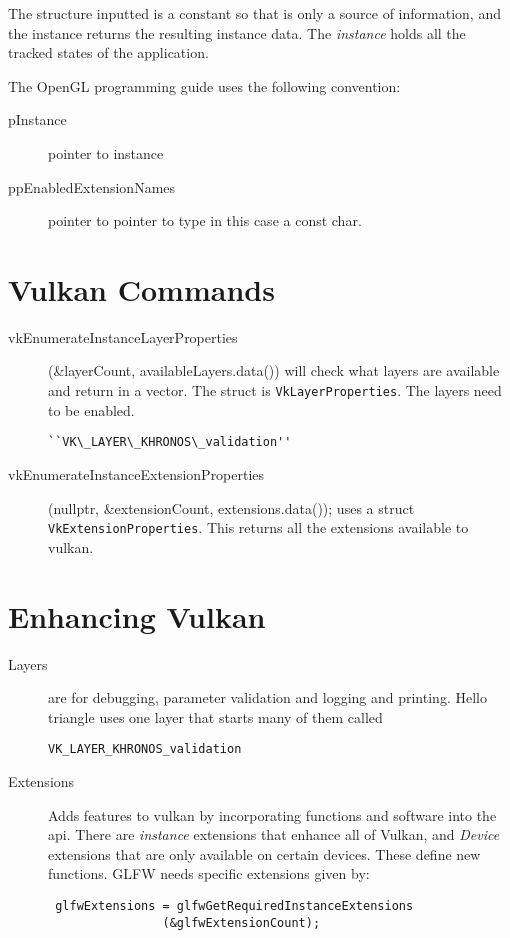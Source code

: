 \documentclass{article}
\begin{document}
The structure inputted is a constant so that is only a source of information, and the
instance returns the resulting instance data.  The \emph{instance} holds all the
tracked states of the application.

The OpenGL programming guide uses the following convention:
\begin{description}
	\item[pInstance]  pointer to instance
	\item[ppEnabledExtensionNames] pointer to pointer to type in this case a
		const char.
\end{description}
\section{Vulkan Commands}

\begin{description}
    \item[vkEnumerateInstanceLayerProperties](\&layer\-Count,
available\-Layers\-.data())
    will check what layers are available and return in a vector. The struct is
    \verb|VkLayerProperties|.  The layers need to be enabled.  \begin{verbatim}
``VK\_LAYER\_KHRONOS\_validation''
\end{verbatim}
\item[vkEnumerateInstanceExtensionProperties] 
	(nullptr, &extensionCount, 
			extensions.data());
 uses a struct \verb|VkExtensionProperties|. This returns all the extensions
available to vulkan.

\end{description}
\section{Enhancing Vulkan}
\begin{description}
\item[Layers] are for
debugging, parameter validation and logging and printing. Hello triangle uses
one layer that starts many of them called  
\begin{verbatim}
VK_LAYER_KHRONOS_validation
\end{verbatim}
\item[Extensions]
Adds features to vulkan by incorporating functions and software into the api.
There are \emph{instance} extensions that enhance all of Vulkan, and
\emph{Device} extensions that are only available on certain devices. These
define new functions. GLFW needs specific extensions given by:
\begin{verbatim}
 glfwExtensions = glfwGetRequiredInstanceExtensions
				(&glfwExtensionCount);
\end{verbatim}
\end{description}
\end{document}

